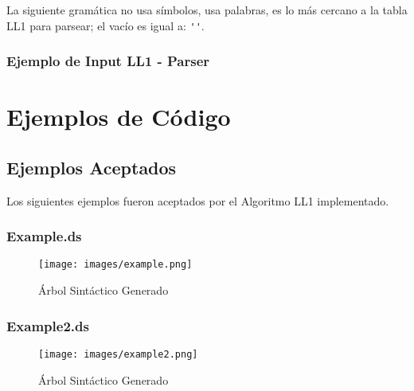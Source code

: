\documentclass[https://www.overleaf.com/project/63761df255a8a9f4a15c3579
	letterpaper, %
	10pt, %
]{CSUniSchoolLabReport}
\begin{document}
        La siguiente gramática no usa símbolos, usa palabras, es lo más cercano a la tabla LL1 para parsear; el vacío es igual a: \verb|''|.
        

        \subsubsection{Ejemplo de Input LL1 - Parser}
            

    
    \section{Ejemplos de Código}
    
    \subsection{Ejemplos Aceptados}
    Los siguientes ejemplos fueron aceptados por el Algoritmo LL1 implementado.
        \subsubsection{Example.ds}
            

            \begin{figure}[H]
            	\centering
            	\texttt{[image: images/example.png]}
                \caption{ Árbol Sintáctico Generado }
            \end{figure}
            
        \subsubsection{Example2.ds}
            

            \begin{figure}[H]
            	\centering
            	\texttt{[image: images/example2.png]}
                \caption{ Árbol Sintáctico Generado }
            \end{figure}
            
\end{document}
